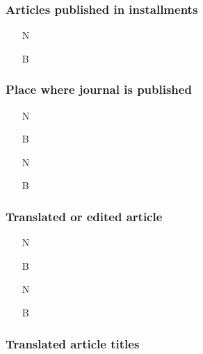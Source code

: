 \documentclass[11pt,letterpaper,oneside]{article}
\begin{document}
\setcounter{subsubsection}{188}
\subsubsection{Articles published in installments}


\begin{itemize}
\item[N] 

\item[B] 
\end{itemize}

\setcounter{subsubsection}{190}
\subsubsection{Place where journal is published}

\begin{itemize}
\item[N] 

\item[B] 

\item[N] 

\item[B] 
\end{itemize}

\subsubsection{Translated or edited article}
\label{14.192}

\begin{itemize}
\item[N] 

\item[B] 

\item[N] 

\item[B] 
\end{itemize}

\setcounter{subsubsection}{193}
\subsubsection{Translated article titles}
\end{document}
